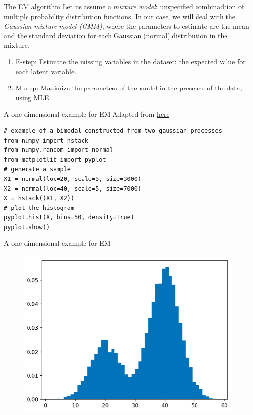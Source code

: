 \documentclass{beamer}
\begin{document}
\begin{frame}{The EM algorithm}
    Let us assume a {\em mixture model}: unspecified combinadtion of multiple probability distribution functions. In our case, we will deal with the {\em Gaussian mixture model (GMM)}, where the parameters to estimate are the mean and the standard deviation for each Gaussian (normal) distribution in the mixture.
    \begin{enumerate}
        \item E-step: Estimate the missing variables in the dataset: the expected value for each latent variable.
        \item M-step: Maximize the parameters of the model in the presence of the data, using MLE.
    \end{enumerate}
\end{frame}

\begin{frame}[fragile]{A one dimensional example for EM}
    Adapted from \href{https://machinelearningmastery.com/expectation-maximization-em-algorithm/}{here}
    \begin{lstlisting}
# example of a bimodal constructed from two gaussian processes
from numpy import hstack
from numpy.random import normal
from matplotlib import pyplot
# generate a sample
X1 = normal(loc=20, scale=5, size=3000)
X2 = normal(loc=40, scale=5, size=7000)
X = hstack((X1, X2))
# plot the histogram
pyplot.hist(X, bins=50, density=True)
pyplot.show()
    \end{lstlisting}
\end{frame}

\begin{frame}{A one dimensional example for EM}
    \begin{figure}
        \includegraphics[scale=0.5]{hist}
    \end{figure}
\end{frame}
\end{document}
